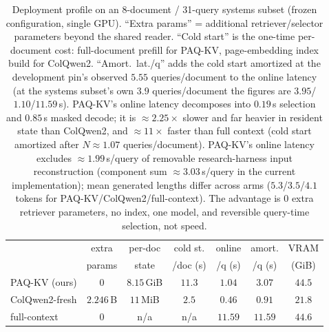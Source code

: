 \documentclass[letterpaper]{article} %
\newcommand{\paqc}{\textsc{PAQ-KV}}
\begin{document}
\begin{table}[t]
\centering\small
\setlength{\tabcolsep}{4pt}%
\setlength{\tabcolsep}{1.2pt}%
\begin{tabular}{lcccccc}
\toprule
 & extra & per-doc & cold st. & online & amort. & VRAM \\
 & params & state & /doc (s) & /q (s) & /q (s) & (GiB) \\
\midrule
\paqc{} (ours)   & $0$        & $8.15$\,GiB & $11.3$ & $1.04$  & $3.07$  & $44.5$ \\
ColQwen2-fresh   & $2.246$\,B & $11$\,MiB   & $2.5$  & $0.46$  & $0.91$  & $21.8$ \\
full-context     & $0$        & n/a         & n/a    & $11.59$ & $11.59$ & $44.6$ \\
\bottomrule
\end{tabular}
\caption{Deployment profile on an 8-document / 31-query systems subset (frozen configuration, single GPU). ``Extra params'' = additional retriever/selector parameters beyond the shared reader. ``Cold start'' is the one-time per-document cost: full-document prefill for \paqc{}, page-embedding index build for ColQwen2. ``Amort.\ lat./q'' adds the cold start amortized at the development pin's observed $5.55$ queries/document to the online latency (at the systems subset's own $3.9$ queries/document the figures are $3.95$/$1.10$/$11.59$\,s). \paqc{}'s online latency decomposes into $0.19$\,s selection and $0.85$\,s masked decode; it is ${\approx}2.25\times$ slower and far heavier in resident state than ColQwen2, and ${\approx}11\times$ faster than full context (cold start amortized after $N{\approx}1.07$ queries/document). \paqc{}'s online latency excludes ${\approx}1.99$\,s/query of removable research-harness input reconstruction (component sum ${\approx}3.03$\,s/query in the current implementation); mean generated lengths differ across arms ($5.3$/$3.5$/$4.1$ tokens for \paqc{}/ColQwen2/full-context). The advantage is $0$ extra retriever parameters, no index, one model, and reversible query-time selection, not speed.}
\label{tab:systems}
\end{table}
\end{document}
